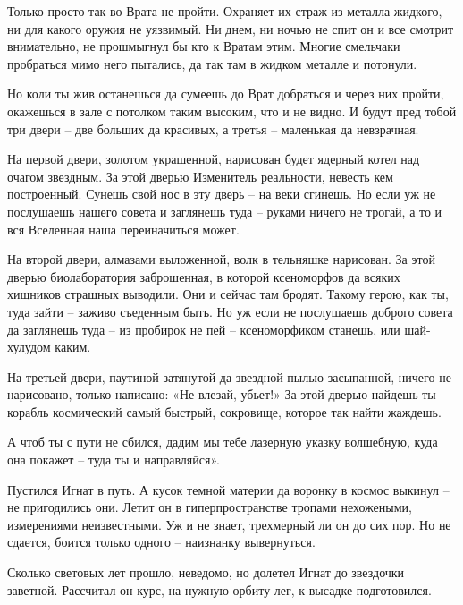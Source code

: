 \documentclass[ebook,oneside,final,openright]{memoir}
\begin{document}
\par
Только просто так во Врата не пройти. Охраняет их страж из металла жидкого, ни для какого оружия не уязвимый. Ни днем, ни ночью не спит он и все смотрит внимательно, не прошмыгнул бы кто к Вратам этим. Многие смельчаки пробраться мимо него пытались, да так там в жидком металле и потонули.\par
\par
Но коли ты жив останешься да сумеешь до Врат добраться и через них пройти, окажешься в зале с потолком таким высоким, что и не видно. И будут пред тобой три двери – две больших да красивых, а третья – маленькая да невзрачная.\par
\par
На первой двери, золотом украшенной, нарисован будет ядерный котел над очагом звездным. За этой дверью Изменитель реальности, невесть кем построенный. Сунешь свой нос в эту дверь – на веки сгинешь. Но если уж не послушаешь нашего совета и заглянешь туда – руками ничего не трогай, а то и вся Вселенная наша переиначиться может.\par
\par
На второй двери, алмазами выложенной, волк в тельняшке нарисован. За этой дверью биолаборатория заброшенная, в которой ксеноморфов да всяких хищников страшных выводили. Они и сейчас там бродят. Такому герою, как ты, туда зайти – заживо съеденным быть. Но уж если не послушаешь доброго совета да заглянешь туда – из пробирок не пей – ксеноморфиком станешь, или шай-хулудом каким.\par
\par
На третьей двери, паутиной затянутой да звездной пылью засыпанной, ничего не нарисовано, только написано: «Не влезай, убьет!» За этой дверью найдешь ты корабль космический самый быстрый, сокровище, которое так найти жаждешь.\par
\par
А чтоб ты с пути не сбился, дадим мы тебе лазерную указку волшебную, куда она покажет – туда ты и направляйся».\par
\par
Пустился Игнат в путь. А кусок темной материи да воронку в космос выкинул – не пригодились они. Летит он в гиперпространстве тропами нехожеными, измерениями неизвестными. Уж и не знает, трехмерный ли он до сих пор. Но не сдается, боится только одного – наизнанку вывернуться.\par
\par
Сколько световых лет прошло, неведомо, но долетел Игнат до звездочки заветной. Рассчитал он курс, на нужную орбиту лег, к высадке подготовился.\par
\end{document}
